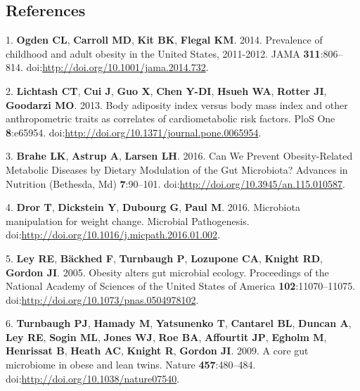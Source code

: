 \documentclass[12pt,]{article}
\begin{document}
\newpage

\subsection*{References}\label{references}

1. \textbf{Ogden CL}, \textbf{Carroll MD}, \textbf{Kit BK},
\textbf{Flegal KM}. 2014. Prevalence of childhood and adult obesity in
the United States, 2011-2012. JAMA \textbf{311}:806--814.
doi:\url{http://doi.org/10.1001/jama.2014.732}.

2. \textbf{Lichtash CT}, \textbf{Cui J}, \textbf{Guo X}, \textbf{Chen
Y-DI}, \textbf{Hsueh WA}, \textbf{Rotter JI}, \textbf{Goodarzi MO}.
2013. Body adiposity index versus body mass index and other
anthropometric traits as correlates of cardiometabolic risk factors.
PloS One \textbf{8}:e65954.
doi:\url{http://doi.org/10.1371/journal.pone.0065954}.

3. \textbf{Brahe LK}, \textbf{Astrup A}, \textbf{Larsen LH}. 2016. Can
We Prevent Obesity-Related Metabolic Diseases by Dietary Modulation of
the Gut Microbiota? Advances in Nutrition (Bethesda, Md)
\textbf{7}:90--101. doi:\url{http://doi.org/10.3945/an.115.010587}.

4. \textbf{Dror T}, \textbf{Dickstein Y}, \textbf{Dubourg G},
\textbf{Paul M}. 2016. Microbiota manipulation for weight change.
Microbial Pathogenesis.
doi:\url{http://doi.org/10.1016/j.micpath.2016.01.002}.

5. \textbf{Ley RE}, \textbf{Bäckhed F}, \textbf{Turnbaugh P},
\textbf{Lozupone CA}, \textbf{Knight RD}, \textbf{Gordon JI}. 2005.
Obesity alters gut microbial ecology. Proceedings of the National
Academy of Sciences of the United States of America
\textbf{102}:11070--11075.
doi:\url{http://doi.org/10.1073/pnas.0504978102}.

6. \textbf{Turnbaugh PJ}, \textbf{Hamady M}, \textbf{Yatsunenko T},
\textbf{Cantarel BL}, \textbf{Duncan A}, \textbf{Ley RE}, \textbf{Sogin
ML}, \textbf{Jones WJ}, \textbf{Roe BA}, \textbf{Affourtit JP},
\textbf{Egholm M}, \textbf{Henrissat B}, \textbf{Heath AC},
\textbf{Knight R}, \textbf{Gordon JI}. 2009. A core gut microbiome in
obese and lean twins. Nature \textbf{457}:480--484.
doi:\url{http://doi.org/10.1038/nature07540}.
\end{document}
